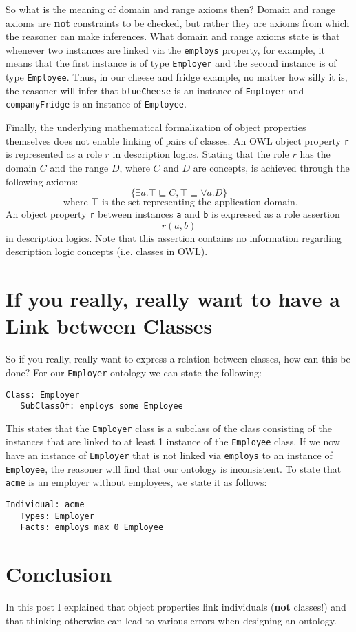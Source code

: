 \documentclass{amsart}
\begin{document}
   
So what is the meaning of domain and range axioms then? Domain and range axioms are \textbf{not} constraints to be checked, but rather they are axioms from which the reasoner can make inferences. What domain and range axioms state is that whenever two instances are linked via the \texttt{employs} property, for example, it means that the first instance is of type \texttt{Employer} and the second instance is of type \texttt{Employee}. Thus, in our cheese and fridge example, no matter how silly it is, the reasoner will infer that \texttt{blueCheese} is an instance of \texttt{Employer} and \texttt{companyFridge} is an instance of \texttt{Employee}.

Finally, the underlying mathematical formalization of object properties themselves does not enable linking of pairs of classes. An OWL object property \texttt{r} is represented as a role $r$ in description logics. Stating that the role $r$ has the domain $C$ and the range $D$, where $C$ and $D$ are concepts, is achieved through the following axioms:
\[\{\exists a.\top \sqsubseteq C, \top \sqsubseteq \forall a.D \}\]
\[\text{ where } \top \text{ is the set representing the application domain.}\]
An object property \texttt{r} between instances \texttt{a} and \texttt{b} is expressed as a role assertion
\[r(a, b)\]
in description logics. Note that this assertion contains no information regarding description logic concepts (i.e. classes in OWL). 
   

   \section{If you really, really want to have a Link between Classes}
So if you really, really want to express a relation between classes, how can this be done? For our \texttt{Employer} ontology we can state the following:
\begin{small}
\begin{verbatim} 
Class: Employer
   SubClassOf: employs some Employee
\end{verbatim}
\end{small}  
This states that the \texttt{Employer} class is a subclass of the class consisting of the instances that are linked to at least 1 instance of the \texttt{Employee} class. If we now have an instance of \texttt{Employer} that is not linked via \texttt{employs} to an instance of \texttt{Employee}, the reasoner will find that our ontology is inconsistent. To state that \texttt{acme} is an employer without employees, we state it as follows:
\begin{small}
\begin{verbatim} 
Individual: acme
   Types: Employer
   Facts: employs max 0 Employee
\end{verbatim}
\end{small}     
   
\section{Conclusion}
In this post I explained that object properties link individuals (\textbf{not} classes!) and that thinking otherwise can lead to various errors when designing an ontology. 


  
  
  
 
\end{document}
